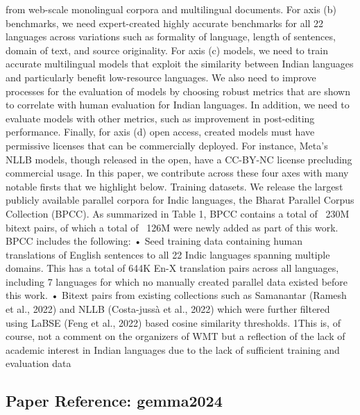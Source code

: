 from web-scale monolingual corpora and multilingual documents. For axis (b) benchmarks, we need expert-created highly accurate benchmarks for all 22 languages across variations such as formality of language, length of sentences, domain of text, and source originality. For axis (c) models, we need to train accurate multilingual models that exploit the similarity between Indian languages and particularly benefit low-resource languages. We also need to improve processes for the evaluation of models by choosing robust metrics that are shown to correlate with human evaluation for Indian languages. In addition, we need to evaluate models with other metrics, such as improvement in post-editing performance. Finally, for axis (d) open access, created models must have permissive licenses that can be commercially deployed. For instance, Meta’s NLLB models, though released in the open, have a CC-BY-NC license precluding commercial usage. In this paper, we contribute across these four axes with many notable firsts that we highlight below. Training datasets. We release the largest publicly available parallel corpora for Indic languages, the Bharat Parallel Corpus Collection (BPCC). As summarized in Table 1, BPCC contains a total of ~230M bitext pairs, of which a total of ~126M were newly added as part of this work. BPCC includes the following: • Seed training data containing human translations of English sentences to all 22 Indic languages spanning multiple domains. This has a total of 644K En-X translation pairs across all languages, including 7 languages for which no manually created parallel data existed before this work. • Bitext pairs from existing collections such as Samanantar (Ramesh et al., 2022) and NLLB (Costa-jussà et al., 2022) which were further filtered using LaBSE (Feng et al., 2022) based cosine similarity thresholds. 1This is, of course, not a comment on the organizers of WMT but a reflection of the lack of academic interest in Indian languages due to the lack of suﬀicient training and evaluation data

\vspace{18pt}


\subsection*{Paper Reference: gemma2024}

